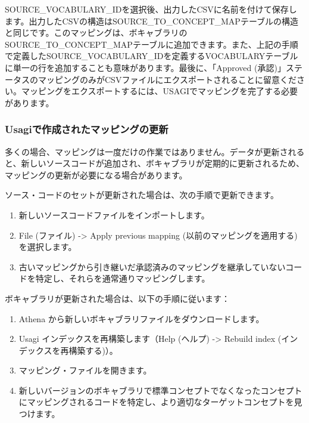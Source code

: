 \documentclass[
  11pt]{book}
\providecommand{\tightlist}{%
  \setlength{\itemsep}{0pt}\setlength{\parskip}{0pt}}
\theoremstyle{definition}
\theoremstyle{definition}
\theoremstyle{definition}
\theoremstyle{definition}
\theoremstyle{remark}
\begin{document}
SOURCE\_VOCABULARY\_IDを選択後、出力したCSVに名前を付けて保存します。出力したCSVの構造はSOURCE\_TO\_CONCEPT\_MAPテーブルの構造と同じです。このマッピングは、ボキャブラリのSOURCE\_TO\_CONCEPT\_MAPテーブルに追加できます。また、上記の手順で定義したSOURCE\_VOCABULARY\_IDを定義するVOCABULARYテーブルに単一の行を追加することも意味があります。最後に、「Approved (承認)」ステータスのマッピングのみがCSVファイルにエクスポートされることに留意ください。マッピングをエクスポートするには、USAGIでマッピングを完了する必要があります。

\subsubsection*{Usagiで作成されたマッピングの更新}\label{usagiux3067ux4f5cux6210ux3055ux308cux305fux30deux30c3ux30d4ux30f3ux30b0ux306eux66f4ux65b0}

多くの場合、マッピングは一度だけの作業ではありません。データが更新されると、新しいソースコードが追加され、ボキャブラリが定期的に更新されるため、マッピングの更新が必要になる場合があります。

ソース・コードのセットが更新された場合は、次の手順で更新できます。

\begin{enumerate}
\def\labelenumi{\arabic{enumi}.}
\tightlist
\item
  新しいソースコードファイルをインポートします。
\item
  File (ファイル) -\textgreater{} Apply previous mapping (以前のマッピングを適用する) を選択します。
\item
  古いマッピングから引き継いだ承認済みのマッピングを継承していないコードを特定し、それらを通常通りマッピングします。
\end{enumerate}

ボキャブラリが更新された場合は、以下の手順に従います：

\begin{enumerate}
\def\labelenumi{\arabic{enumi}.}
\tightlist
\item
  Athena から新しいボキャブラリファイルをダウンロードします。
\item
  Usagi インデックスを再構築します（Help (ヘルプ) -\textgreater{} Rebuild index (インデックスを再構築する)）。
\item
  マッピング・ファイルを開きます。
\item
  新しいバージョンのボキャブラリで標準コンセプトでなくなったコンセプトにマッピングされるコードを特定し、より適切なターゲットコンセプトを見つけます。
\end{enumerate}
\end{document}

